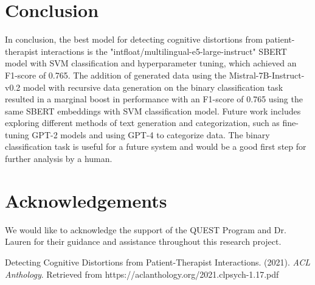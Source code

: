 \documentclass[a0,landscape]{a0poster}
\begin{document}
\begin{multicols}{4}
\color{Teal}
\section*{Conclusion}
\color{Black}

In conclusion, the best model for detecting cognitive distortions from patient-therapist interactions is the "intfloat/multilingual-e5-large-instruct" SBERT model with SVM classification and hyperparameter tuning, which achieved an F1-score of 0.765. The addition of generated data using the Mistral-7B-Instruct-v0.2 model with recursive data generation on the binary classification task resulted in a marginal boost in performance with an F1-score of 0.765 using the same SBERT embeddings with SVM classification model. Future work includes exploring different methods of text generation and categorization, such as fine-tuning GPT-2 models and using GPT-4 to categorize data. The binary classification task is useful for a future system and would be a good first step for further analysis by a human.

\color{Teal}
\section*{Acknowledgements}
\color{Black}

We would like to acknowledge the support of the QUEST Program and Dr. Lauren for their guidance and assistance throughout this research project.

\color{Teal}
\begin{thebibliography}{9}
\color{Black}

Detecting Cognitive Distortions from Patient-Therapist Interactions. (2021). \textit{ACL Anthology}. Retrieved from https://aclanthology.org/2021.clpsych-1.17.pdf
\end{thebibliography}

\end{multicols}
\end{document}
